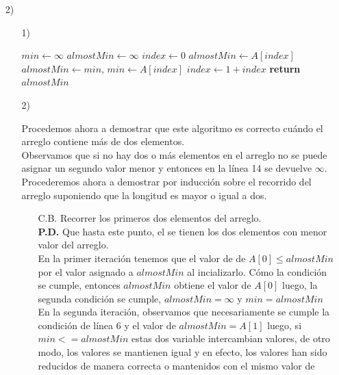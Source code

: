 \documentclass[a4paper, 12pt]{report}
\begin{document}
\begin{enumerate}
\item[2)]{
\begin{enumerate}
    \item[1)]{
        \begin{algorithmic}[1]
            \State $min\gets \infty$
            \State $almostMin\gets \infty$
            \State $index\gets 0$
                    \State $almostMin\gets A[index]$
                        \State $almostMin\gets min$, $min\gets A[index]$
                    \EndIf
                \EndIf
                \State $index\gets 1 + index$
            \EndWhile\label{euclidendwhile}
            \State \textbf{return} $almostMin$
            \EndProcedure
        \end{algorithmic}
    }
    \item[2)]{Procedemos ahora a demostrar que este algoritmo es correcto cuándo
        el arreglo contiene más de dos elementos.\\
        Observamos que si no hay dos o más elementos en el arreglo no se puede
        asignar un segundo valor menor y entonces en la línea 14 se devuelve
        $\infty$.\\
        Procederemos ahora a demostrar por inducción sobre el recorrido del
        arreglo suponiendo que la longitud es mayor o igual a dos.
        \begin{enumerate}
        \item[C.B.]{Recorrer los primeros dos elementos del arreglo.\\
            \textbf{P.D.} Que hasta este punto, el se tienen los dos elementos
            con menor valor del arreglo.\\
            En la primer iteración tenemos que el valor de de $A[0] \leq almostMin$
            por el valor asignado a $almostMin$ al incializarlo. Cómo la condición se
            cumple, entonces $almostMin$ obtiene el valor de $A[0]$ luego, la
            segunda condición se cumple, $almostMin = \infty$ y $min = almostMin$
            En la segunda iteración, observamos que necesariamente se cumple la
            condición de línea 6 y el valor de $almostMin = A[1]$ luego, si
            $min <= almostMin$ estas dos variable intercambian valores, de otro
            modo, los valores se mantienen igual y en efecto, los valores han
            sido reducidos de manera correcta o mantenidos con el mismo valor de
}
\end{enumerate}}
\end{enumerate}}
\end{enumerate}
\end{document}
